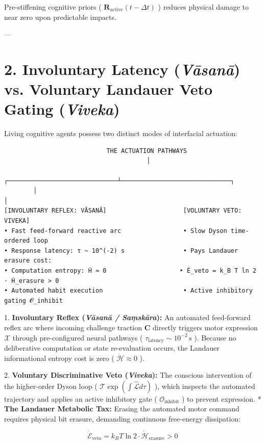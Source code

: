 \documentclass[11pt,a4paper]{article}
\theoremstyle{definition}
\theoremstyle{remark}
\begin{document}
Pre-stiffening cognitive priors ( $\mathbf{R}_{\text{active}}(t - \Delta t)$ ) reduces physical damage to near zero upon predictable impacts.

---

\section{2. Involuntary Latency (\textit{Vāsanā}) vs. Voluntary Landauer Veto Gating (\textit{Viveka})}

Living cognitive agents possess two distinct modes of interfacial actuation:

\begin{verbatim}
                            THE ACTUATION PATHWAYS
                                       │
        ┌──────────────────────────────┴──────────────────────────────┐
        │                                                             │
[INVOLUNTARY REFLEX: VĀSANĀ]                     [VOLUNTARY VETO: VIVEKA]
• Fast feed-forward reactive arc                 • Slow Dyson time-ordered loop
• Response latency: τ ~ 10^(-2) s                • Pays Landauer erasure cost:
• Computation entropy: Ḣ ≈ 0                    • Ė_veto = k_B T ln 2 · Ḣ_erasure > 0
• Automated habit execution                      • Active inhibitory gating 𝓞_inhibit
\end{verbatim}

1. \textbf{Involuntary Reflex (\textit{Vāsanā / Saṃskāra}):}
An automated feed-forward reflex arc where incoming challenge traction $\mathbf{C}$ directly triggers motor expression $\boldsymbol{\mathcal{X}}$ through pre-configured neural pathways ( $\tau_{\text{latency}} \sim 10^{-2}\,\mathrm{s}$ ). Because no deliberative computation or state re-evaluation occurs, the Landauer informational entropy cost is zero ( $\dot{\mathcal{H}} \approx 0$ ).

2. \textbf{Voluntary Discriminative Veto (\textit{Viveka}):}
The conscious intervention of the higher-order Dyson loop ( $\mathcal{T} \exp(\int \hat{\mathcal{L}} d\tau)$ ), which inspects the automated trajectory and applies an active inhibitory gate ( $\mathcal{O}_{\text{inhibit}}$ ) to prevent expression.
* \textbf{The Landauer Metabolic Tax:} Erasing the automated motor command requires physical bit erasure, demanding continuous free-energy dissipation:


\begin{equation}
\boxed{\dot{\mathcal{E}}_{\text{veto}} = k_B T \ln 2 \cdot \dot{\mathcal{H}}_{\text{erasure}} > 0}
\end{equation}
\end{document}
